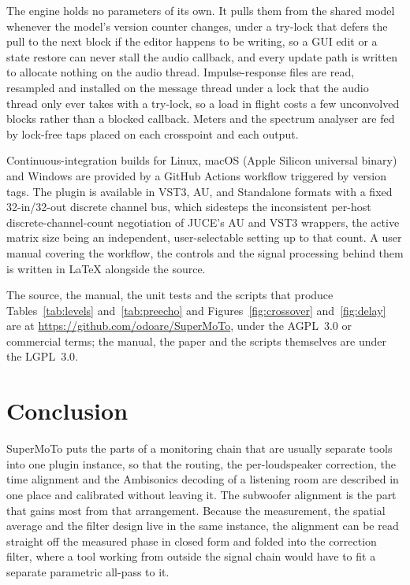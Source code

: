 \documentclass[10pt,a4paper]{article}
\begin{document}
The engine holds no parameters of its own. It pulls them from the shared model whenever the model's version counter changes, under a try-lock that defers the pull to the next block if the editor happens to be writing, so a GUI edit or a state restore can never stall the audio callback, and every update path is written to allocate nothing on the audio thread. Impulse-response files are read, resampled and installed on the message thread under a lock that the audio thread only ever takes with a try-lock, so a load in flight costs a few unconvolved blocks rather than a blocked callback. Meters and the spectrum analyser are fed by lock-free taps placed on each crosspoint and each output.

Continuous-integration builds for Linux, macOS (Apple Silicon universal binary) and Windows are provided by a GitHub Actions workflow triggered by version tags. The plugin is available in VST3, AU, and Standalone formats with a fixed 32-in/32-out discrete channel bus, which sidesteps the inconsistent per-host discrete-channel-count negotiation of JUCE's AU and VST3 wrappers, the active matrix size being an independent, user-selectable setting up to that count. A user manual covering the workflow, the controls and the signal processing behind them is written in LaTeX alongside the source.

The source, the manual, the unit tests and the scripts that produce Tables~\ref{tab:levels} and~\ref{tab:preecho} and Figures~\ref{fig:crossover} and~\ref{fig:delay} are at \url{https://github.com/odoare/SuperMoTo}, under the AGPL~3.0 or commercial terms; the manual, the paper and the scripts themselves are under the LGPL~3.0.

\section{Conclusion}\label{sec:conclusion}

SuperMoTo puts the parts of a monitoring chain that are usually separate tools into one plugin instance, so that the routing, the per-loudspeaker correction, the time alignment and the Ambisonics decoding of a listening room are described in one place and calibrated without leaving it. The subwoofer alignment is the part that gains most from that arrangement. Because the measurement, the spatial average and the filter design live in the same instance, the alignment can be read straight off the measured phase in closed form and folded into the correction filter, where a tool working from outside the signal chain would have to fit a separate parametric all-pass to it.
\end{document}
